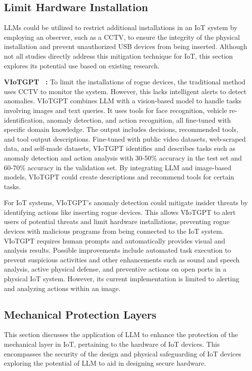 \subsection{Limit Hardware Installation}
%
LLMs could be utilized to restrict additional installations in an IoT system by employing an observer, such as a CCTV, to ensure the integrity of the physical installation and prevent unauthorized USB devices from being inserted.
Although not all studies directly address this mitigation technique for IoT, this section explores its potential use based on existing research.

\smallskip
\noindent \textbf{VIoTGPT~\citet{zhong2023viotgpt} : } To limit the installations of rogue devices, the traditional method uses CCTV to monitor the system.
However, this lacks intelligent alerts to detect anomalies.
VIoTGPT combines LLM with a vision-based model to handle tasks involving images and text queries.
It uses tools for face recognition, vehicle re-identification, anomaly detection, and action recognition, all fine-tuned with specific domain knowledge.
The output includes decisions, recommended tools, and tool output descriptions.
Fine-tuned with public video datasets, web-scraped data, and self-made datasets, VIoTGPT identifies and describes tasks such as anomaly detection and action analysis with 30-50\% accuracy in the test set and 60-70\% accuracy in the validation set.
By integrating LLM and image-based models, VIoTGPT could create descriptions and recommend tools for certain tasks.

For IoT systems, VIoTGPT's anomaly detection could mitigate insider threats by identifying actions like inserting rogue devices.
This allows VIoTGPT to alert users of potential threats and limit hardware installations, preventing rogue devices with malicious programs from being connected to the IoT system.
VIoTGPT requires human prompts and automatically provides visual and analysis results.
Possible improvements include automated task execution to prevent suspicious activities and other enhancements such as sound and speech analysis, active physical defense, and preventive actions on open ports in a physical IoT system.
However, its current implementation is limited to alerting and analyzing actions within an image.
%
\subsection{Mechanical Protection Layers}
%
This section discusses the application of LLM to enhance the protection of the mechanical layer in IoT, pertaining to the hardware of IoT devices.
This encompasses the security of the design and physical safeguarding of IoT devices exploring the potential of LLM to aid in designing secure hardware.

